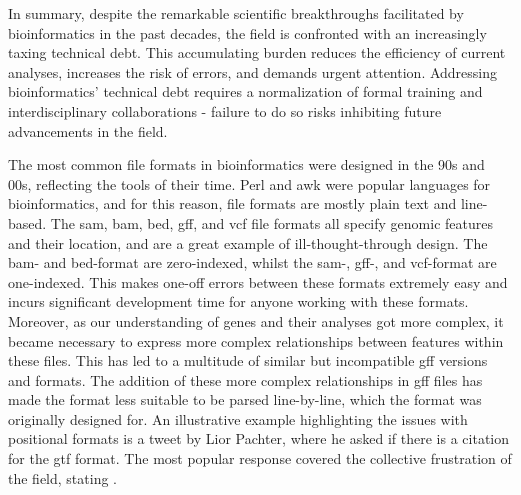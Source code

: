 In summary, despite the remarkable scientific breakthroughs facilitated by bioinformatics in the past decades, the field is confronted with an increasingly taxing technical debt. This accumulating burden reduces the efficiency of current analyses, increases the risk of errors, and demands urgent attention. Addressing bioinformatics' technical debt requires a normalization of formal training and interdisciplinary collaborations - failure to do so risks inhibiting future advancements in the field.








The most common file formats in bioinformatics were designed in the 90s and 00s, reflecting the tools of their time. Perl and awk were popular languages for bioinformatics, and for this reason, file formats are mostly plain text and line-based. The sam, bam, bed, gff, and vcf file formats all specify genomic features and their location, and are a great example of ill-thought-through design. The bam- and bed-format are zero-indexed\cite{Li2009}, whilst the sam-, gff-, and vcf-format are one-indexed\cite{Li2009,Danecek2011}. This makes one-off errors between these formats extremely easy and incurs significant development time for anyone working with these formats. Moreover, as our understanding of genes and their analyses got more complex, it became necessary to express more complex relationships between features within these files. This has led to a multitude of similar but incompatible gff versions and formats. The addition of these more complex relationships in gff files has made the format less suitable to be parsed line-by-line, which the format was originally designed for. An illustrative example highlighting the issues with positional formats is a tweet by Lior Pachter, where he asked if there is a citation for the gtf format. The most popular response covered the collective frustration of the field, stating .

